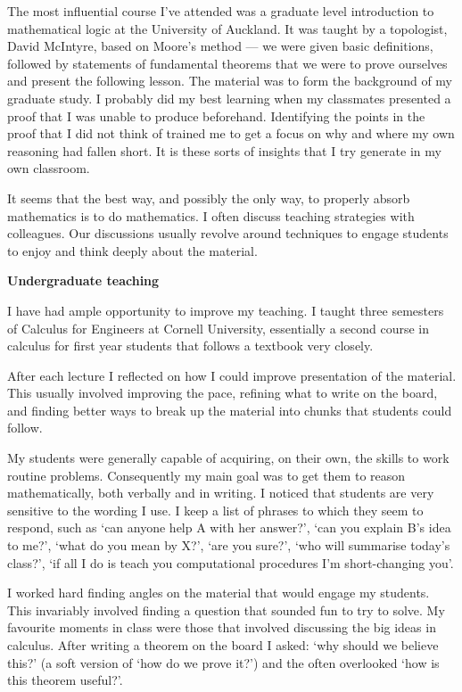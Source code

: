 \documentclass[12pt]{article}
\theoremstyle{plain} \numberwithin{equation}{section}
\theoremstyle{definition}
\begin{document}
\thispagestyle{fancy}

The most influential course I've attended was a graduate level introduction to
mathematical logic at the University of Auckland.  It was taught by a topologist, David McIntyre, based on Moore's method --- 
we were given basic definitions, followed by statements of
fundamental theorems that we were to prove ourselves and present the following
lesson. The material was to form the background of my
graduate study. I probably did my best learning when my classmates presented a
proof that I was unable to produce beforehand. Identifying the points in the proof that I
did not think of trained me to get a focus on why and where my own reasoning
had fallen short. It is these sorts of insights that I try generate in my own classroom.

It seems that the best way, and possibly the only way, to properly absorb mathematics is to do mathematics. 
 I often discuss teaching strategies with colleagues.
Our discussions usually revolve around techniques to engage students to enjoy and think deeply about the material.

{\bf Undergraduate teaching}

I have had ample opportunity to improve my teaching. 
I taught three semesters of Calculus for Engineers at Cornell University, essentially a second course in calculus for first year students that follows a textbook very closely.

After each lecture I reflected on how I could improve presentation of the material. This usually involved improving the pace, refining what to write on the board, and finding better ways to break up the material into chunks that students could follow.

My students were generally capable of acquiring, on their own, the skills to work routine problems. %
Consequently my main goal 
was to get them to reason mathematically, both verbally and in writing. I noticed that students are very sensitive to the wording I use.
I keep a list of phrases to which they seem to respond, such as  `can anyone help A with her answer?', `can you explain B's idea to me?', `what do you mean by X?',
`are you sure?', `who will summarise today's class?', `if all I do is teach you computational procedures I'm short-changing you'.

I worked hard finding angles on the material that would engage my students. This invariably involved finding a question that
sounded fun to try to solve. My favourite moments in class were those that involved discussing the big ideas in calculus. After writing a theorem on the board I asked: `why should we believe this?' (a soft version of `how do we prove it?') and the often overlooked `how is this theorem useful?'.
\end{document}

